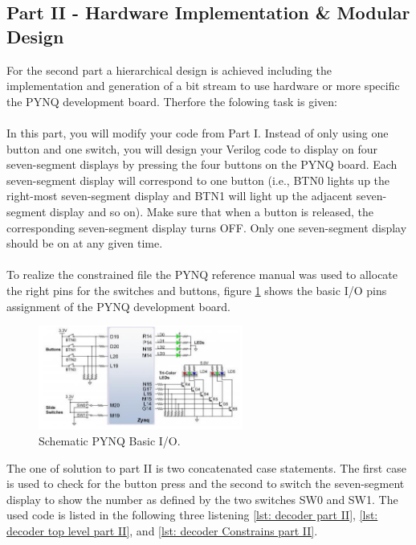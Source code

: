 \subsection{Part II - Hardware Implementation \& Modular Design}\label{subsec: Hardware Implementation Modular Design}
For the second part a hierarchical design is achieved including the implementation and generation of a bit stream to use hardware or more specific the PYNQ development board. Therfore the folowing task is given:
\\
\\
In this part, you will modify your code from Part I. Instead of only using one button and one switch, you will
design your Verilog code to display on four seven-segment displays by pressing the four buttons on the PYNQ
board. Each seven-segment display will correspond to one button (i.e., BTN0 lights up the right-most seven-segment
display and BTN1 will light up the adjacent seven-segment display and so on). Make sure that when a
button is released, the corresponding seven-segment display turns OFF. Only one seven-segment display should
be on at any given time.
\\
\\
To realize the constrained file the PYNQ reference manual was used to allocate the right pins for the switches and buttons, figure \ref{fig: PYNQ_BasicIO} shows the basic I/O pins assignment of the PYNQ development board.
\begin{figure}[H]
	\centering
	\includegraphics[width=0.6\textwidth]{01_images/PYNQ_BasicIO.png}
	\caption{Schematic PYNQ Basic I/O. \cite{PYNG_RM}}
	\label{fig: PYNQ_BasicIO}
\end{figure}
The one of solution to part II is two concatenated case statements. The first case is used to check for the button press and the second to switch the seven-segment display to show the number as defined by the two switches SW0 and SW1. The used code is listed in the following three listening \ref{lst: decoder part II}, \ref{lst: decoder top level part II}, and \ref{lst: decoder Constrains part II}.

